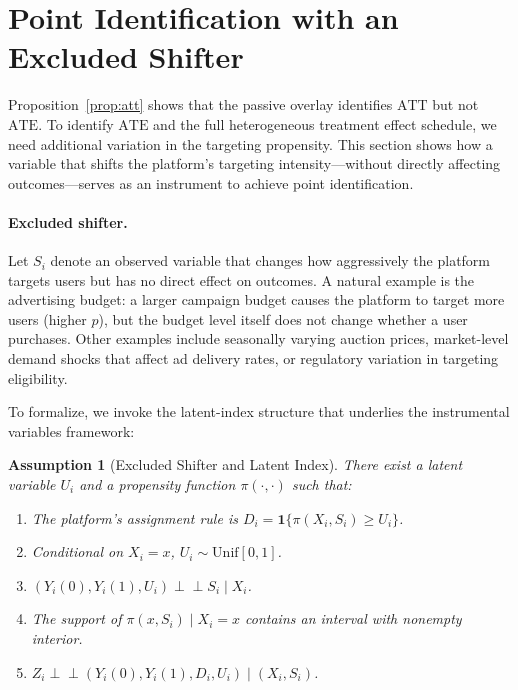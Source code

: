 \documentclass[12pt]{article}
\newtheorem{assumption}{Assumption}
\newcommand{\indep}{\perp\!\!\!\perp}
\newcommand{\ATT}{\mathrm{ATT}}
\newcommand{\ATE}{\mathrm{ATE}}
\begin{document}
\section{Point Identification with an Excluded Shifter}
\label{sec:pointid}

Proposition~\ref{prop:att} shows that the passive overlay identifies $\ATT$
but not $\ATE$. To identify $\ATE$ and the full heterogeneous treatment
effect schedule, we need additional variation in the targeting propensity.
This section shows how a variable that shifts the platform's targeting
intensity---without directly affecting outcomes---serves as an instrument
to achieve point identification.

\paragraph{Excluded shifter.} Let $S_i$ denote an observed variable that
changes how aggressively the platform targets users but has no direct effect
on outcomes. A natural example is the advertising budget: a larger campaign
budget causes the platform to target more users (higher $p$), but the
budget level itself does not change whether a user purchases. Other examples
include seasonally varying auction prices, market-level demand shocks that
affect ad delivery rates, or regulatory variation in targeting eligibility.

To formalize, we invoke the latent-index structure that underlies the
instrumental variables framework:

\begin{assumption}[Excluded Shifter and Latent Index]
\label{ass:excluded}
There exist a latent variable $U_i$ and a propensity function $\pi(\cdot,\cdot)$
such that:
\begin{enumerate}
  \item The platform's assignment rule is $D_i = \mathbf{1}\{\pi(X_i, S_i) \geq U_i\}$.
  \item Conditional on $X_i = x$, $U_i \sim \mathrm{Unif}[0,1]$.
  \item $(Y_i(0), Y_i(1), U_i) \indep S_i \mid X_i$.
  \item The support of $\pi(x, S_i) \mid X_i = x$ contains an interval with
        nonempty interior.
  \item $Z_i \indep (Y_i(0), Y_i(1), D_i, U_i) \mid (X_i, S_i)$.
\end{enumerate}
\end{assumption}
\end{document}
